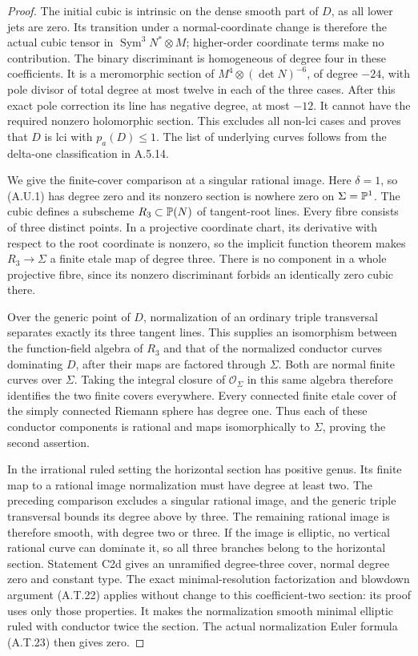 \begin{proof}
The initial cubic is intrinsic on the dense smooth
part of $D$, as all lower jets are zero. Its
transition under a normal-coordinate change is
therefore the actual cubic tensor in
$\operatorname{Sym}^3N^*\otimes M$; higher-order
coordinate terms make no contribution. The binary
discriminant is homogeneous of degree four in
these coefficients. It is a meromorphic section
of $M^4\otimes(\det N)^{-6}$, of degree $-24$,
with pole divisor of total degree at most twelve
in each of the three cases. After this exact pole
correction its line has negative degree, at most
$-12$. It cannot have the required nonzero
holomorphic section. This excludes all non-lci
cases and proves that $D$ is lci with $p_a(D)\le1$.
The list of underlying curves follows from the
delta-one classification in A.5.14.

We give the finite-cover comparison at a singular
rational image. Here $\delta=1$, so (A.U.1) has
degree zero and its nonzero section is nowhere zero
on $\Sigma=\mathbb P^1$. The cubic defines a subscheme
$R_3\subset\mathbb P(N)$ of tangent-root lines. Every
fibre consists of three distinct points. In a
projective coordinate chart, its derivative with
respect to the root coordinate is nonzero, so the
implicit function theorem makes
$R_3\to\Sigma$ a finite etale map of degree three.
There is no component in a whole projective fibre,
since its nonzero discriminant forbids an identically
zero cubic there.

Over the generic point of $D$, normalization of an
ordinary triple transversal separates exactly its
three tangent lines. This supplies an isomorphism
between the function-field algebra of $R_3$ and
that of the normalized conductor curves dominating
$D$, after their maps are factored through $\Sigma$.
Both are normal finite curves over $\Sigma$.
Taking the integral closure of $\mathcal O_\Sigma$
in this same algebra therefore identifies the two
finite covers everywhere. Every connected finite
etale cover of the simply connected Riemann sphere
has degree one. Thus each of these conductor
components is rational and maps isomorphically to
$\Sigma$, proving the second assertion.

In the irrational ruled setting the horizontal
section has positive genus. Its finite map to a
rational image normalization must have degree at
least two. The preceding comparison excludes a
singular rational image, and the generic triple
transversal bounds its degree above by three.
The remaining rational image is therefore smooth,
with degree two or three. If the image is elliptic,
no vertical rational curve can dominate it, so all
three branches belong to the horizontal section.
Statement C2d gives an unramified degree-three
cover, normal degree zero and constant type.
The exact minimal-resolution factorization and
blowdown argument (A.T.22) applies without change
to this coefficient-two section: its proof uses
only those properties. It makes the normalization
smooth minimal elliptic ruled with conductor twice
the section. The actual normalization Euler formula
(A.T.23) then gives zero.
\end{proof}

